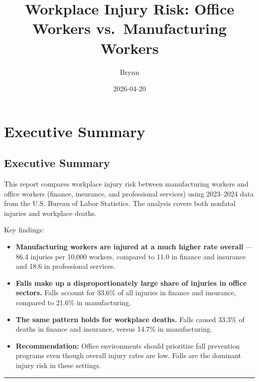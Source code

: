 \documentclass[
  letterpaper,
  DIV=11,
  numbers=noendperiod]{scrreprt}
\title{Workplace Injury Risk: Office Workers vs.~Manufacturing Workers}
\author{Brynn}
\date{2026-04-20}
\providecommand{\tightlist}{%
  \setlength{\itemsep}{0pt}\setlength{\parskip}{0pt}}\usepackage{longtable,booktabs,array}
\renewcommand*\contentsname{Table of contents}
\newcommand\contentsname{Table of contents}
\begin{document}
\maketitle

\renewcommand*\contentsname{Table of contents}
{
\hypersetup{linkcolor=}
\setcounter{tocdepth}{2}
\tableofcontents
}


\chapter{Executive Summary}\label{executive-summary}

\section{Executive Summary}\label{executive-summary-1}

This report compares workplace injury risk between manufacturing workers
and office workers (finance, insurance, and professional services) using
2023--2024 data from the U.S. Bureau of Labor Statistics. The analysis
covers both nonfatal injuries and workplace deaths.

Key findings:

\begin{itemize}
\tightlist
\item
  \textbf{Manufacturing workers are injured at a much higher rate
  overall} --- 86.4 injuries per 10,000 workers, compared to 11.0 in
  finance and insurance and 18.6 in professional services.
\item
  \textbf{Falls make up a disproportionately large share of injuries in
  office sectors.} Falls account for 33.6\% of all injuries in finance
  and insurance, compared to 21.6\% in manufacturing.
\item
  \textbf{The same pattern holds for workplace deaths.} Falls caused
  33.3\% of deaths in finance and insurance, versus 14.7\% in
  manufacturing.
\item
  \textbf{Recommendation:} Office environments should prioritize fall
  prevention programs even though overall injury rates are low. Falls
  are the dominant injury risk in these settings.
\end{itemize}

\begin{center}\rule{0.5\linewidth}{0.5pt}\end{center}

\end{document}
